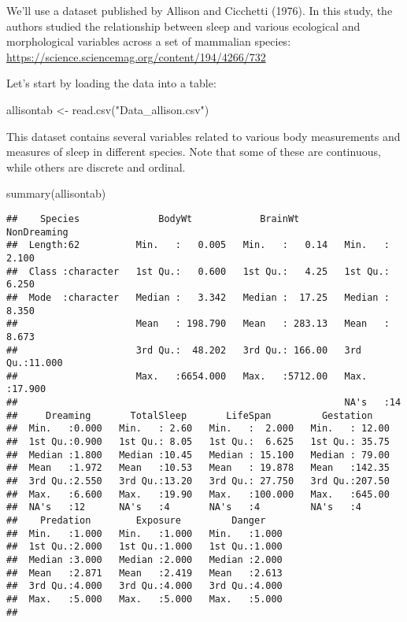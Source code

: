 \documentclass[
]{book}
\newenvironment{Shaded}{\begin{snugshade}}{\end{snugshade}}
\newcommand{\FunctionTok}[1]{\textcolor[rgb]{0.00,0.00,0.00}{#1}}
\newcommand{\NormalTok}[1]{#1}
\newcommand{\OtherTok}[1]{\textcolor[rgb]{0.56,0.35,0.01}{#1}}
\newcommand{\StringTok}[1]{\textcolor[rgb]{0.31,0.60,0.02}{#1}}
\begin{document}
We'll use a dataset published by Allison and Cicchetti (1976). In this study, the authors studied the relationship between sleep and various ecological and morphological variables across a set of mammalian species:
\url{https://science.sciencemag.org/content/194/4266/732}

Let's start by loading the data into a table:

\begin{Shaded}
\begin{Highlighting}[]
\NormalTok{allisontab }\OtherTok{\textless{}{-}} \FunctionTok{read.csv}\NormalTok{(}\StringTok{"Data\_allison.csv"}\NormalTok{)}
\end{Highlighting}
\end{Shaded}

This dataset contains several variables related to various body measurements and measures of sleep in different species. Note that some of these are continuous, while others are discrete and ordinal.

\begin{Shaded}
\begin{Highlighting}[]
\FunctionTok{summary}\NormalTok{(allisontab)}
\end{Highlighting}
\end{Shaded}

\begin{verbatim}
##    Species              BodyWt            BrainWt         NonDreaming    
##  Length:62          Min.   :   0.005   Min.   :   0.14   Min.   : 2.100  
##  Class :character   1st Qu.:   0.600   1st Qu.:   4.25   1st Qu.: 6.250  
##  Mode  :character   Median :   3.342   Median :  17.25   Median : 8.350  
##                     Mean   : 198.790   Mean   : 283.13   Mean   : 8.673  
##                     3rd Qu.:  48.202   3rd Qu.: 166.00   3rd Qu.:11.000  
##                     Max.   :6654.000   Max.   :5712.00   Max.   :17.900  
##                                                          NA's   :14      
##     Dreaming       TotalSleep       LifeSpan         Gestation     
##  Min.   :0.000   Min.   : 2.60   Min.   :  2.000   Min.   : 12.00  
##  1st Qu.:0.900   1st Qu.: 8.05   1st Qu.:  6.625   1st Qu.: 35.75  
##  Median :1.800   Median :10.45   Median : 15.100   Median : 79.00  
##  Mean   :1.972   Mean   :10.53   Mean   : 19.878   Mean   :142.35  
##  3rd Qu.:2.550   3rd Qu.:13.20   3rd Qu.: 27.750   3rd Qu.:207.50  
##  Max.   :6.600   Max.   :19.90   Max.   :100.000   Max.   :645.00  
##  NA's   :12      NA's   :4       NA's   :4         NA's   :4       
##    Predation        Exposure         Danger     
##  Min.   :1.000   Min.   :1.000   Min.   :1.000  
##  1st Qu.:2.000   1st Qu.:1.000   1st Qu.:1.000  
##  Median :3.000   Median :2.000   Median :2.000  
##  Mean   :2.871   Mean   :2.419   Mean   :2.613  
##  3rd Qu.:4.000   3rd Qu.:4.000   3rd Qu.:4.000  
##  Max.   :5.000   Max.   :5.000   Max.   :5.000  
## 
\end{verbatim}
\end{document}
